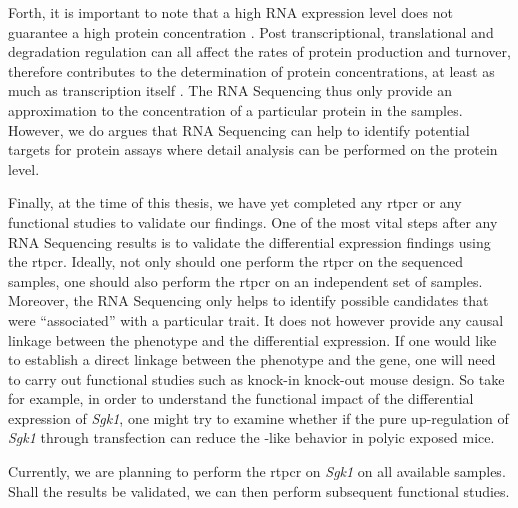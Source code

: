 Forth, it is important to note that a high RNA expression level does not guarantee a high protein concentration \citep{Vogel2012}.
Post transcriptional, translational and degradation regulation can all affect the rates of protein production and turnover, therefore contributes to the determination of protein concentrations, at least as much as transcription itself \citep{Vogel2012}.
The RNA Sequencing thus only provide an approximation to the concentration of a particular protein in the samples.
However, we do argues that RNA Sequencing can help to identify potential targets for protein assays where detail analysis can be performed on the protein level.

Finally, at the time of this thesis, we have yet completed any \gls{rtpcr} or any functional studies to validate our findings.
One of the most vital steps after any RNA Sequencing results is to validate the differential expression findings using the \gls{rtpcr}.
Ideally, not only should one perform the \gls{rtpcr} on the sequenced samples, one should also perform the \gls{rtpcr} on an independent set of samples. 
Moreover, the RNA Sequencing only helps to identify possible candidates that were ``associated'' with a particular trait.
It does not however provide any causal linkage between the phenotype and the differential expression.
If one would like to establish a direct linkage between the phenotype and the gene, one will need to carry out functional studies such as knock-in knock-out mouse design.
So take for example, in order to understand the functional impact of the differential expression of \textit{Sgk1}, one might try to examine whether if the pure up-regulation of \textit{Sgk1} through transfection can reduce the -like behavior in \gls{polyic} exposed mice.

Currently, we are planning to perform the \gls{rtpcr} on \textit{Sgk1} on all available samples. 
Shall the results be validated, we can then perform subsequent functional studies. 

\newpage
